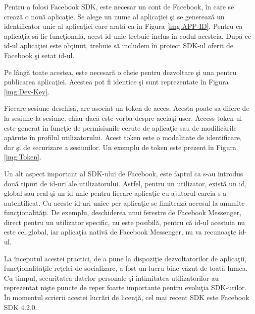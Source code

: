 	Pentru a folosi Facebook SDK, este necesar un cont de Facebook, \^{i}n care se creaz\u{a} o nou\u{a} aplica\c{t}ie. Se alege un nume al aplica\c{t}iei \c{s}i se genereaz\u{a} un identificator unic al aplica\c{t}iei care arat\u{a} ca \^{i}n Figura \ref{img:APP-ID}. Pentru ca aplica\c{t}ia s\u{a} fie func\c{t}ional\u{a}, acest id unic trebuie inclus in codul acesteia. Dup\u{a} ce id-ul aplica\c{t}iei este ob\c{t}inut, trebuie s\u{a} includem \^{i}n proiect SDK-ul oferit de Facebook \c{s}i setat id-ul. 


	Pe l\^{a}ng\u{a} toate acestea, este necesar\u{a} o cheie pentru dezvoltare \c{s}i una pentru publicarea aplica\c{t}iei. Acestea pot fi identice \c{s}i sunt reprezentate \^{i}n Figura \ref{img:Dev-Key}.


	Fiecare sesiune deschis\u{a}, are asociat un token de acces. Acesta poate sa difere de la sesiune la sesiune, chiar dac\u{a} este vorba despre acela\c{s}i user. Access token-ul este generat \^{i}n func\c{t}ie de permisiunile cerute de aplica\c{t}ie sau de modific\u{a}rile ap\u{a}rute \^{i}n profilul utilizatorului. Acest token este o modalitate de identificare, dar \c{s}i de securizare a sesiunilor. Un exemplu de token este prezent \^{i}n Figura \ref{img:Token}.


	Un alt aspect important al SDK-ului de Facebook, este faptul ca s-au introdus dou\u{a} tipuri de id-uri ale utilizatorului. Astfel, pentru un utilizator, exist\u{a} un id, global sau real \c{s}i un id unic pentru fiecare aplica\c{t}ie cu ajutorul careia s-a autentificat. Cu aceste id-uri unice per aplica\c{t}ie se limiteaz\u{a} accesul la anumite func\c{t}ionalit\u{a}\c{t}i. De exemplu, deschiderea unui ferestre de Facebook Messenger, direct pentru un utilizator specific, nu este posibil\u{a}, pentru c\u{a} id-ul acestuia nu este cel global, iar aplica\c{t}ia nativ\u{a} de Facebook Messenger, nu va recunoa\c{s}te id-ul. 

	La \^{i}nceputul acestei practici, de a pune la dispozi\c{t}ie dezvoltatorilor de aplica\c{t}ii, func\c{t}ionalit\u{a}\c{t}ile re\c{t}elei de socializare, a fost un lucru bine v\u{a}zut de toat\u{a} lumea. Cu timpul, securitatea datelor personale \c{s}i intimitatea utilizatorilor au reprezentat ni\c{s}te puncte de reper foarte importante pentru evolu\c{t}ia SDK-urilor. \^{I}n momentul scrierii acestei lucr\u{a}ri de licen\c{t}\u{a}, cel mai recent SDK este Facebook SDK 4.2.0. 
	
